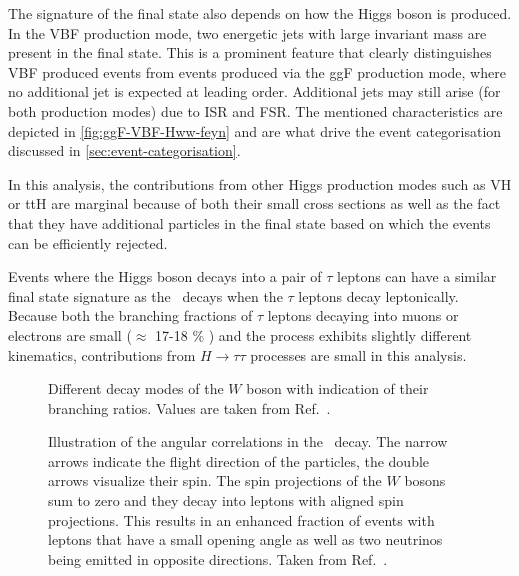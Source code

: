 The signature of the final state also depends on how the Higgs boson is produced.
In the VBF production mode, two energetic jets with large invariant mass are present in the final state. This is a prominent feature that clearly distinguishes VBF produced \HWW events from events produced via the ggF production mode, where no additional jet is expected at leading order. Additional jets may still arise (for both production modes) due to ISR and FSR. The mentioned characteristics are depicted in \cref{fig:ggF-VBF-Hww-feyn} and are what drive the event categorisation discussed in \cref{sec:event-categorisation}. 

In this analysis, the contributions from other Higgs production modes such as VH or ttH are marginal because of both their small cross sections as well as the fact that they have additional particles in the final state based on which the events can be efficiently rejected.

Events where the Higgs boson decays into a pair of $\tau$ leptons can have a similar final state signature as the \HWWdet\ decays when the $\tau$ leptons decay leptonically. 
Because both the branching fractions of $\tau$ leptons decaying into muons or electrons are small ($\approx$ 17-18 \% \cite{PDG2020}) and the process exhibits slightly different kinematics, contributions from $H \to \tau\tau$ processes are small in this analysis. 


\begin{figure}
    \caption[Different decay modes of the $W$ boson with indication of their branching ratios.]{Different decay modes of the $W$ boson with indication of their branching ratios. Values are taken from Ref.~\cite{PDG2020}.}
    \label{fig:w-branching-ratios}
\end{figure}

\begin{figure}
    \caption[Angular correlations in the \HWWdet\ decay.]{Illustration of the angular correlations in the \HWWdet\ decay. The narrow arrows indicate the flight direction of the particles, the double arrows visualize their spin. The spin projections of the $W$ bosons sum to zero and they decay into leptons with aligned spin projections. This results in an enhanced fraction of events with leptons that have a small opening angle as well as two neutrinos being emitted in opposite directions. Taken from Ref.~\cite{PhysRevD.92.012006}.}
    \label{fig:spin-correlations}
\end{figure}
